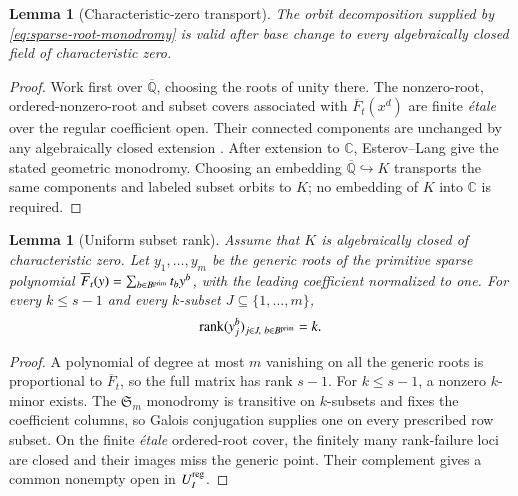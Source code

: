 \documentclass[10pt,fleqn]{article}
\numberwithin{equation}{section}
\newtheorem{lemma}[theorem]{Lemma}
\newcommand{\rank}{\operatorname{rank}}
\begin{document}
\begin{lemma}[Characteristic-zero transport]\label{lem:monodromy-transport}
The orbit decomposition supplied by \eqref{eq:sparse-root-monodromy} is valid after base
change to every algebraically closed field of characteristic zero.
\end{lemma}

\begin{proof}
Work first over $\overline{\mathbb Q}$, choosing the roots of unity
there.  The nonzero-root, ordered-nonzero-root and subset covers
associated with $\overline F_t(x^d)$ are finite
\emph{\'etale} over the regular coefficient open.  Their connected
components are unchanged by any algebraically closed extension
\cite[Tag 0363]{Stacks}.  After extension to $\mathbb C$,
Esterov--Lang give the stated geometric monodromy.  Choosing an embedding
$\overline{\mathbb Q}\hookrightarrow K$ transports the same components
and labeled subset orbits to $K$; no embedding of $K$ into $\mathbb C$
is required.
\end{proof}

\begin{lemma}[Uniform subset rank]\label{lem:uniform-subset-rank}
Assume that $K$ is algebraically closed of characteristic zero.
Let $y_1,\ldots,y_m$ be the generic roots of the primitive sparse polynomial
$\overline F_t(y)=\sum_{b\in B^{\rm prim}}t_by^b$, with the leading coefficient normalized to one.
For every $k\le s-1$ and every $k$-subset $J\subseteq\{1,\ldots,m\}$,
\begin{equation}\label{eq:uniform-subset-rank}
 \rank (y_j^b)_{j\in J,\ b\in B^{\rm prim}}=k.
\end{equation}
\end{lemma}

\begin{proof}
A polynomial of degree at most $m$ vanishing on all the generic roots
is proportional to $\overline F_t$, so the full matrix has rank $s-1$.
For $k\le s-1$, a nonzero $k$-minor exists.  The $\mathfrak S_m$
monodromy is transitive on $k$-subsets and fixes the coefficient
columns, so Galois conjugation supplies one on every prescribed row subset.
On the finite \emph{\'etale} ordered-root cover, the finitely many
rank-failure loci are closed and their images miss the generic point.
Their complement gives a common nonempty open in $U_I^{\rm reg}$.
\end{proof}
\end{document}
